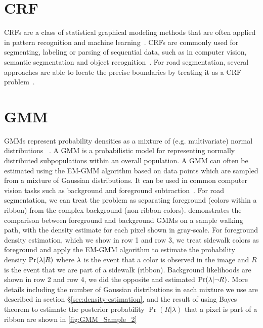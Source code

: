 \section{\ac{CRF}} \label{sec:crf}
\acfp{CRF} are a class of statistical graphical modeling methods that are often applied in pattern recognition and machine learning~\cite{MAL-013}. 
\acp{CRF} are commonly used for segmenting, labeling or parsing of sequential data, such as in computer vision, semantic segmentation and object recognition~\cite{RuizSarmiento2015UPGMppA, 1315232, lafferty2001conditional}. 
For road segmentation, several approaches are able to locate the precise 
boundaries by treating it as a \ac{CRF} problem~\cite{ActiveContou09, Achanta:149300}. 


\section{\ac{GMM}}\label{sec:gmm}

\acfp{GMM} represent probability densities as a mixture of (e.g. multivariate) normal distributions 
~\cite{sridharan2014gaussian}. A \ac{GMM} is a probabilistic model for representing normally
distributed subpopulations within an overall population. A \ac{GMM} can often  be estimated using
the \ac{EM-GMM} algorithm based on data points which are sampled from a mixture of Gaussian distributions. It can
be used in common computer vision tasks such as background and foreground
subtraction~\cite{1333992}. For road segmentation, we can treat the problem as separating foreground
(colors within a ribbon) from the complex background (non-ribbon colors). 
demonstrates the comparison between foreground and background \acp{GMM} on a sample walking path,
with the density estimate for each pixel shown in gray-scale. For foreground density estimation,
which we show in row 1 and row 3, we treat sidewalk colors as foreground and apply the \ac{EM-GMM}
algorithm to estimate the probability density $\Pr(\lambda{}|R)$ where $\lambda{}$ is the event that a
color is observed in the image and $R$ is the event that we are part of a sidewalk (ribbon).
Background likelihoods are shown in row 2 and row 4, we did the opposite and estimated
$\Pr(\lambda{}|\neg R)$. More details including the number of Gaussian distributions in each mixture
we use are described in section \S\ref{sec:density-estimation}, and the result of using Bayes theorem to estimate the posterior probability 
$\Pr(R|\lambda)$ that a pixel is part of a ribbon are shown in \figurename{}\ref{fig:GMM_Sample_2}

